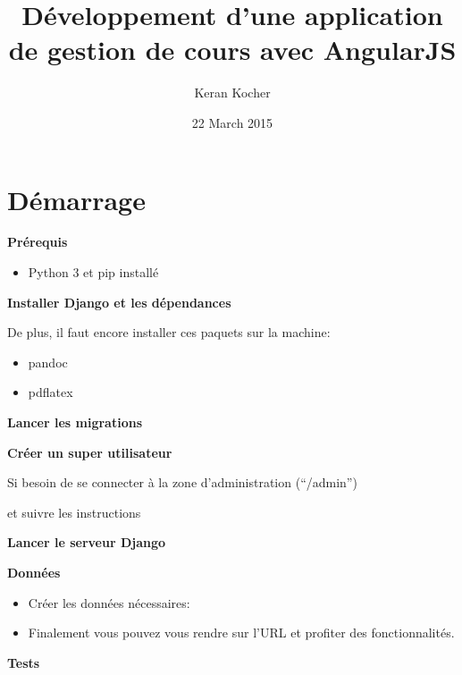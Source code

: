 \documentclass[letterpaper,10pt,oneside]{sphinxmanual}
\title{Développement d'une application de gestion de cours avec AngularJS}
\date{22 March 2015}
\author{Keran Kocher}
\begin{document}
\maketitle
\tableofcontents
{}\label{index::doc}



\chapter{Démarrage}
\label{start:demarrage}\label{start:developpement-d-une-application-de-gestions-de-cours-avec-angularjs}\label{start::doc}
\textbf{Prérequis}
\begin{itemize}
\item {} 
Python 3 et pip installé

\end{itemize}

\textbf{Installer Django et les dépendances}


De plus, il faut encore installer ces paquets sur la machine:
\begin{itemize}
\item {} 
pandoc

\item {} 
pdflatex

\end{itemize}

\textbf{Lancer les migrations}


\textbf{Créer un super utilisateur}

Si besoin de se connecter à la zone d'administration (``/admin'')

 et suivre les instructions

\textbf{Lancer le serveur Django}


\textbf{Données}
\begin{itemize}
\item {} 
Créer les données nécessaires: 

\item {} 
Finalement vous pouvez vous rendre sur l'URL  et profiter des fonctionnalités.

\end{itemize}

\textbf{Tests}
\end{document}
